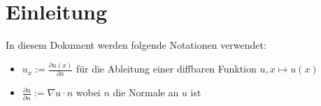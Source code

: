 
\setcounter{section}{-1}
\section{Einleitung}
In diesem Dokument werden folgende Notationen verwendet:
\begin{itemize}
\item $u_x:=\frac{\partial u(x)}{\partial x}$ für die Ableitung einer diffbaren Funktion $u, x\mapsto u(x)$
\item $\frac{\partial u}{\partial n}:=\nabla u\cdot n$ wobei $n$ die Normale an $u$ ist
\end{itemize}

